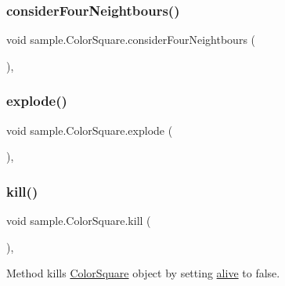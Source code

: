 \subsubsection{\texorpdfstring{consider\+Four\+Neightbours()}{considerFourNeightbours()}}
{\footnotesize\ttfamily void sample.\+Color\+Square.\+consider\+Four\+Neightbours (\begin{DoxyParamCaption}{ }\end{DoxyParamCaption})\hspace{0.3cm}{\ttfamily [inline]}, {\ttfamily [package]}}

\mbox{\label{classsample_1_1_color_square_a7a9627028e034d129f9d408c89226aab}} 
\subsubsection{\texorpdfstring{explode()}{explode()}}
{\footnotesize\ttfamily void sample.\+Color\+Square.\+explode (\begin{DoxyParamCaption}{ }\end{DoxyParamCaption})\hspace{0.3cm}{\ttfamily [inline]}, {\ttfamily [package]}}

\mbox{\label{classsample_1_1_color_square_a3089d9adec502bdcbec959c142872397}} 
\subsubsection{\texorpdfstring{kill()}{kill()}}
{\footnotesize\ttfamily void sample.\+Color\+Square.\+kill (\begin{DoxyParamCaption}{ }\end{DoxyParamCaption})\hspace{0.3cm}{\ttfamily [inline]}, {\ttfamily [package]}}

Method kills \mbox{\hyperlink{classsample_1_1_color_square}{Color\+Square}} object by setting \mbox{\hyperlink{classsample_1_1_color_square_ac89c88958f422f4b2293215274f1d958}{alive}} to false. \mbox{\label{classsample_1_1_color_square_a01bfc80ce93985adcaf9f26226a5166c}} 
